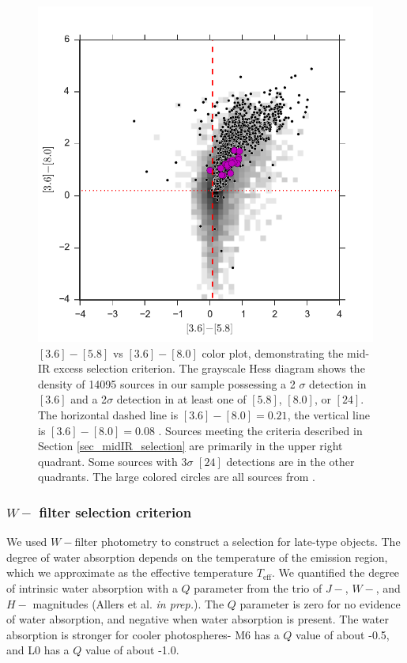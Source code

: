 \begin{figure}[ht!]
  \caption{$[3.6]-[5.8]$ vs $[3.6]-[8.0]$ color plot, demonstrating the mid-IR excess selection criterion.  The grayscale Hess diagram shows the density of 14095 sources in our sample possessing a 2 $\sigma$ detection in $[3.6]$ and a 2$\sigma$ detection in at least one of $[5.8]$, $[8.0]$, or $[24]$.  The horizontal dashed line is $[3.6]-[8.0]=0.21$, the vertical line is $[3.6]-[8.0]=0.08$ \citep{2006ApJ...651..502P}.  Sources meeting the criteria described in Section \ref{sec_midIR_selection} are primarily in the upper right quadrant.  Some sources with 3$\sigma$ $[24]$ detections are in the other quadrants.  The large colored circles are all sources from \citet{allers06}. \label{fig_midIR_selection}}
\centering
\includegraphics[scale=0.6]{chIMACS/figures/disk_selection_allers}
\end{figure}

\subsubsection{$W-$ filter selection criterion}
We used $W-$filter photometry to construct a selection for late-type objects.  The degree of water absorption depends on the temperature of the emission region, which we approximate as the effective temperature $T_{\mathrm{eff}}$.  We  quantified the degree of intrinsic water absorption with a $Q$ parameter from the trio of $J-$, $W-$, and $H-$ magnitudes (Allers et al. \emph{in prep.}).  The $Q$ parameter is zero for no evidence of water absorption, and negative when water absorption is present.  The water absorption is stronger for cooler photospheres- M6 has a $Q$ value of about -0.5, and L0 has a $Q$ value of about -1.0.  

